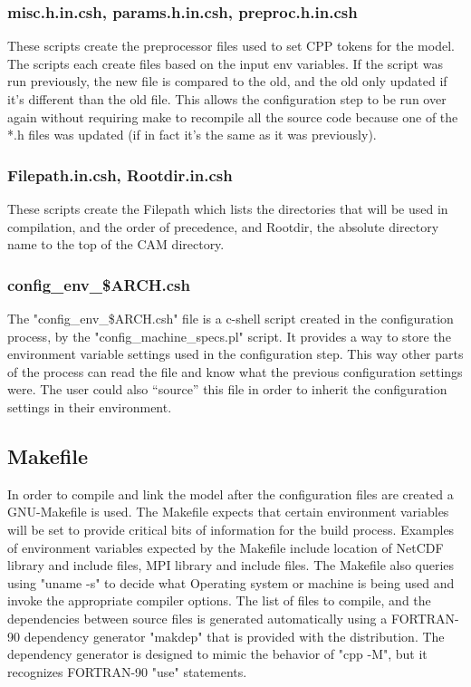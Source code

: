 \documentclass[]{article}
\begin{document}
\subsubsection{misc.h.in.csh, params.h.in.csh, preproc.h.in.csh}
These scripts create the preprocessor files used to set 
CPP tokens for the model. The scripts each create files based on the
input env variables. If the script was run previously, the new file is 
compared to the old, and the old only updated if it's different than
the old file. This allows the configuration step to be run over again
without requiring make to recompile all the source code because one of 
the *.h files was updated (if in fact it's the same as it was previously).

\subsubsection{Filepath.in.csh, Rootdir.in.csh}
These scripts create the Filepath which lists the directories that
will be used in compilation, and the order of precedence, and Rootdir, 
the absolute directory name to the top of the CAM directory.
\subsubsection{config\_env\_\$ARCH.csh}
The "config\_env\_\$ARCH.csh" file is a c-shell script created in the
configuration process, by the "config\_machine\_specs.pl" script. It provides a way 
to store the environment variable settings used in the configuration step. 
This way other parts of the process can read the file and know what the previous
configuration settings were. The user could also ``source'' this file 
in order to inherit the configuration settings in their environment.
\subsection{Makefile}
In order to compile and link the model after the configuration files
are created a GNU-Makefile is used. The Makefile expects that certain environment
variables will be set to provide critical bits of information for the build
process. Examples of environment variables expected by the Makefile include location 
of NetCDF library and include files, MPI library and include files. The Makefile also
queries using "uname -s" to decide what Operating system or machine is being used and 
invoke the appropriate compiler options. The list of files to compile, and the dependencies
between source files is generated automatically using a FORTRAN-90 dependency generator "makdep"
that is provided with the distribution. The dependency generator is designed to mimic the
behavior of "cpp -M", but it recognizes FORTRAN-90 "use" statements.
\end{document}
